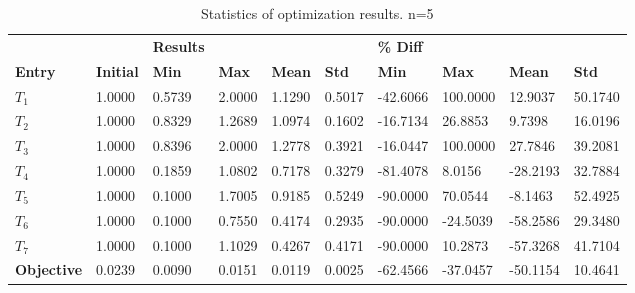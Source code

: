 \begin{table}[H]
\centering
\begin{tabular}{llllllllll}
\textbf{} & \textbf{} & \cellcolor[HTML]{EFEFEF}\textbf{Results} & \cellcolor[HTML]{EFEFEF} & \cellcolor[HTML]{EFEFEF} & \cellcolor[HTML]{EFEFEF} & \cellcolor[HTML]{EFEFEF}\textbf{\% Diff} & \cellcolor[HTML]{EFEFEF} & \cellcolor[HTML]{EFEFEF} & \cellcolor[HTML]{EFEFEF} \\
\rowcolor[HTML]{EFEFEF} 
\textbf{Entry} & \textbf{Initial} & \textbf{Min} & \textbf{Max} & \textbf{Mean} & \textbf{Std} & \textbf{Min} & \textbf{Max} & \textbf{Mean} & \textbf{Std} \\
$T_1$ & 1.0000 & 0.5739 & 2.0000 & 1.1290 & 0.5017 & -42.6066 & 100.0000 & 12.9037 & 50.1740 \\ 
$T_2$ & 1.0000 & 0.8329 & 1.2689 & 1.0974 & 0.1602 & -16.7134 & 26.8853 & 9.7398 & 16.0196 \\ 
$T_3$ & 1.0000 & 0.8396 & 2.0000 & 1.2778 & 0.3921 & -16.0447 & 100.0000 & 27.7846 & 39.2081 \\ 
$T_4$ & 1.0000 & 0.1859 & 1.0802 & 0.7178 & 0.3279 & -81.4078 & 8.0156 & -28.2193 & 32.7884 \\ 
$T_5$ & 1.0000 & 0.1000 & 1.7005 & 0.9185 & 0.5249 & -90.0000 & 70.0544 & -8.1463 & 52.4925 \\ 
$T_6$ & 1.0000 & 0.1000 & 0.7550 & 0.4174 & 0.2935 & -90.0000 & -24.5039 & -58.2586 & 29.3480 \\ 
$T_7$ & 1.0000 & 0.1000 & 1.1029 & 0.4267 & 0.4171 & -90.0000 & 10.2873 & -57.3268 & 41.7104 \\ 
\rowcolor[HTML]{EFEFEF} 
\textbf{Objective} & 0.0239 & 0.0090 & 0.0151 & 0.0119 & 0.0025 & -62.4566 & -37.0457 & -50.1154 & 10.4641 \\ 
\end{tabular}
\caption{Statistics of optimization results. n=5}
\label{tab:StatisticsOptimizationAnalysis}
\end{table}